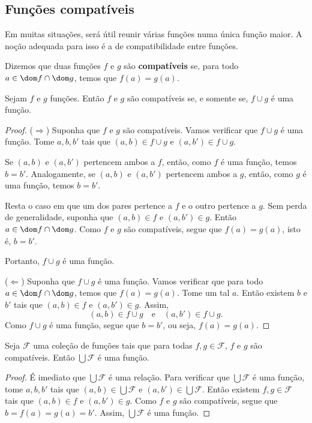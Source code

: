 \subsection{Funções compatíveis}\label{subsec:funcoesCompativeis}
Em muitas situações, será útil reunir várias funções numa única função maior.
A noção adequada para isso é a de compatibilidade entre funções.
\begin{definition}[$\BST$]\label{def:funcoesCompativeis}
    Dizemos que duas funções $f$ e $g$ são \textbf{compatíveis} se, para todo $a \in \dom f \cap \dom g$, temos que $f(a) = g(a)$.
\end{definition}
\begin{lemma}[$\BST$]\label{lem:compatibilidadeEUniaoDeFuncoes}
    Sejam $f$ e $g$ funções.
    Então $f$ e $g$ são compatíveis se, e somente se, $f\cup g$ é uma função.
\end{lemma}
\begin{proof}
    ($\Rightarrow$) Suponha que $f$ e $g$ são compatíveis.
    Vamos verificar que $f\cup g$ é uma função.
    Tome $a, b, b'$ tais que $(a, b) \in f\cup g$ e $(a, b') \in f\cup g$.

    Se $(a,b)$ e $(a,b')$ pertencem ambos a $f$, então, como $f$ é uma função, temos $b=b'$.
    Analogamente, se $(a,b)$ e $(a,b')$ pertencem ambos a $g$, então, como $g$ é uma função, temos $b=b'$.

    Resta o caso em que um dos pares pertence a $f$ e o outro pertence a $g$.
    Sem perda de generalidade, suponha que $(a,b)\in f$ e $(a,b')\in g$.
    Então $a\in \dom f\cap \dom g$.
    Como $f$ e $g$ são compatíveis, segue que $f(a)=g(a)$, isto é, $b=b'$.

    Portanto, $f\cup g$ é uma função.

    ($\Leftarrow$) Suponha que $f\cup g$ é uma função.
    Vamos verificar que para todo $a \in \dom f \cap \dom g$, temos que $f(a) = g(a)$.
    Tome um tal $a$.
    Então existem $b$ e $b'$ tais que $(a,b)\in f$ e $(a,b')\in g$. Assim,
    \[
        (a,b)\in f\cup g \quad\text{e}\quad (a,b')\in f\cup g.
    \]
    Como $f\cup g$ é uma função, segue que $b=b'$, ou seja, $f(a)=g(a)$.
\end{proof}
\begin{proposition}[$\BST$]\label{prop:uniaoDeFuncoesCompativeis}
    Seja $\mathcal F$ uma coleção de funções tais que para todas $f, g \in \mathcal F$, $f$ e $g$ são compatíveis.
    Então $\bigcup \mathcal F$ é uma função.
\end{proposition}
\begin{proof}
    É imediato que $\bigcup \mathcal F$ é uma relação.
    Para verificar que $\bigcup \mathcal F$ é uma função, tome $a, b, b'$ tais que $(a, b) \in \bigcup \mathcal F$ e $(a, b') \in \bigcup \mathcal F$.
    Então existem $f, g \in \mathcal F$ tais que $(a, b) \in f$ e $(a, b') \in g$.
    Como $f$ e $g$ são compatíveis, segue que $b=f(a)=g(a)=b'$.
    Assim, $\bigcup \mathcal F$ é uma função.
\end{proof}
